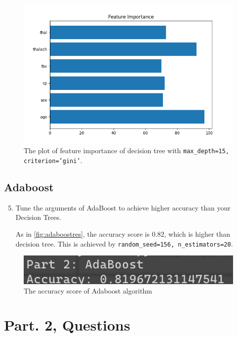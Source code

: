 \documentclass[twocolumn]{extarticle}
\begin{document}
\begin{figure}[H]
\centering
\includegraphics[width=0.95\linewidth]{feature_importance}
\caption{The plot of feature importance of decision tree with \texttt{max\_depth=15, criterion='gini'}.}
\label{fig:featureimportance}
\end{figure}




\subsection{Adaboost}

\begin{enumerate}
\setcounter{enumi}{4}
\item Tune the arguments of AdaBoost to achieve higher accuracy than your Decision Trees.

As in \autoref{fig:adaboostres}, the accuracy score is 0.82, which is higher than decision tree. This is achieved by \texttt{random\_seed=156, n\_estimators=20}.
\end{enumerate}

\begin{figure}[H]
\centering
\includegraphics[width=0.95\linewidth]{adaboost_res}
\caption{The accuracy score of Adaboost algorithm}
\label{fig:adaboostres}
\end{figure}


\section{Part. 2, Questions}
\end{document}
